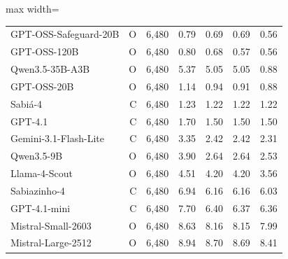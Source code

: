 \begin{table}[htbp]
\begin{adjustbox}{max width=\linewidth}
\begin{tabular}{lrrrrrr}
GPT-OSS-Safeguard-20B & \textsf{O} & 6{,}480 & \cellcolor[HTML]{b8e6b8}0.79 & \cellcolor[HTML]{b8e6b8}0.69 & \cellcolor[HTML]{b8e6b8}0.69 & \cellcolor[HTML]{b8e6b8}0.56 \\
GPT-OSS-120B & \textsf{O} & 6{,}480 & \cellcolor[HTML]{b8e6b8}0.80 & \cellcolor[HTML]{b8e6b8}0.68 & \cellcolor[HTML]{b8e6b8}0.57 & \cellcolor[HTML]{b8e6b8}0.56 \\
Qwen3.5-35B-A3B & \textsf{O} & 6{,}480 & \cellcolor[HTML]{ffe080}5.37 & \cellcolor[HTML]{ffe080}5.05 & \cellcolor[HTML]{ffe080}5.05 & \cellcolor[HTML]{b8e6b8}0.88 \\
GPT-OSS-20B & \textsf{O} & 6{,}480 & \cellcolor[HTML]{b8e6b8}1.14 & \cellcolor[HTML]{b8e6b8}0.94 & \cellcolor[HTML]{b8e6b8}0.91 & \cellcolor[HTML]{b8e6b8}0.88 \\
Sabi\'a-4 & \textsf{C} & 6{,}480 & \cellcolor[HTML]{b8e6b8}1.23 & \cellcolor[HTML]{b8e6b8}1.22 & \cellcolor[HTML]{b8e6b8}1.22 & \cellcolor[HTML]{b8e6b8}1.22 \\
GPT-4.1 & \textsf{C} & 6{,}480 & \cellcolor[HTML]{b8e6b8}1.70 & \cellcolor[HTML]{b8e6b8}1.50 & \cellcolor[HTML]{b8e6b8}1.50 & \cellcolor[HTML]{b8e6b8}1.50 \\
Gemini-3.1-Flash-Lite & \textsf{C} & 6{,}480 & \cellcolor[HTML]{f0f4a8}3.35 & \cellcolor[HTML]{f0f4a8}2.42 & \cellcolor[HTML]{f0f4a8}2.42 & \cellcolor[HTML]{f0f4a8}2.31 \\
Qwen3.5-9B & \textsf{O} & 6{,}480 & \cellcolor[HTML]{f0f4a8}3.90 & \cellcolor[HTML]{f0f4a8}2.64 & \cellcolor[HTML]{f0f4a8}2.64 & \cellcolor[HTML]{f0f4a8}2.53 \\
Llama-4-Scout & \textsf{O} & 6{,}480 & \cellcolor[HTML]{f0f4a8}4.51 & \cellcolor[HTML]{f0f4a8}4.20 & \cellcolor[HTML]{f0f4a8}4.20 & \cellcolor[HTML]{f0f4a8}3.56 \\
Sabiazinho-4 & \textsf{C} & 6{,}480 & \cellcolor[HTML]{ffe080}6.94 & \cellcolor[HTML]{ffe080}6.16 & \cellcolor[HTML]{ffe080}6.16 & \cellcolor[HTML]{ffe080}6.03 \\
GPT-4.1-mini & \textsf{C} & 6{,}480 & \cellcolor[HTML]{ffe080}7.70 & \cellcolor[HTML]{ffe080}6.40 & \cellcolor[HTML]{ffe080}6.37 & \cellcolor[HTML]{ffe080}6.36 \\
Mistral-Small-2603 & \textsf{O} & 6{,}480 & \cellcolor[HTML]{ffe080}8.63 & \cellcolor[HTML]{ffe080}8.16 & \cellcolor[HTML]{ffe080}8.15 & \cellcolor[HTML]{ffe080}7.99 \\
Mistral-Large-2512 & \textsf{O} & 6{,}480 & \cellcolor[HTML]{ffe080}8.94 & \cellcolor[HTML]{ffe080}8.70 & \cellcolor[HTML]{ffe080}8.69 & \cellcolor[HTML]{ffe080}8.41 \\

\end{tabular}
\end{adjustbox}
\end{table}
